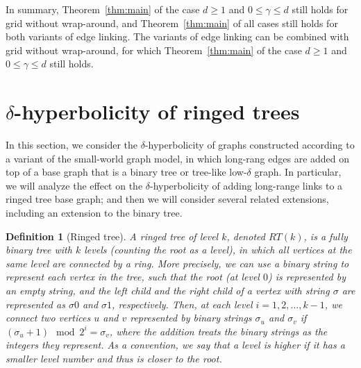 \documentclass[11pt]{article}
\newtheorem{defi}{Definition}
\begin{document}
In summary, Theorem~\ref{thm:main} of the case $d\geq1$ and $0\leq\gamma\leq d$ still holds for grid without wrap-around, and Theorem~\ref{thm:main} of all cases still holds for both variants of edge linking. The variants of edge linking can be combined with grid without wrap-around, for which Theorem~\ref{thm:main} of the case $d\geq1$ and $0\leq\gamma\leq d$ still holds.

\section{$\delta$-hyperbolicity of ringed trees} \label{sec:ringedtree}

In this section, we consider the $\delta$-hyperbolicity of graphs constructed 
according to a variant of the small-world graph model, in which long-rang 
edges are added on top of a base graph that is a binary tree or tree-like 
low-$\delta$ graph.
In particular, we will analyze the effect on the $\delta$-hyperbolicity of 
adding long-range links to a ringed tree base graph; and then we will 
consider several related extensions, including an extension to the binary 
tree.

\begin{defi}[Ringed tree]
A {\em ringed tree} of level $k$, denoted $RT(k)$, is a fully binary tree 
with $k$ levels (counting the root as a level), in which all vertices at the 
same level are connected by a ring.
More precisely, we can use a binary string to represent each vertex
	in the tree, such that the root (at level $0$) 
	is represented by an empty string,
	and the left child and the right child of a vertex with string $\sigma$ are
	represented as $\sigma 0$ and $\sigma 1$, respectively.
Then, at each level $i=1,2,\ldots, k-1$, we connect two vertices
	$u$ and $v$ represented by binary strings $\sigma_u$ and $\sigma_v$
	if $(\sigma_u + 1) \mod 2^i = \sigma_v$, where the addition treats
	the binary strings as the integers they represent. 
As a convention, we say that a level is higher if it has a smaller 
	level number and thus is closer to the root.
\end{defi}
\end{document}
